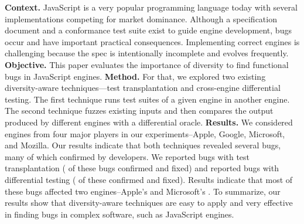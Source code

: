 \textbf{Context.} JavaScript is a very popular programming language today with several
implementations competing for market dominance. Although a
specification document and a conformance test suite exist to guide
engine development, bugs occur and have important practical
consequences. Implementing correct
engines is challenging because the spec is intentionally
incomplete and evolves frequently.
\textbf{Objective.} This paper evaluates the importance of
diversity to find functional bugs in JavaScript engines. \textbf{Method.} For that, we
explored two existing diversity-aware techniques---test transplantation and
cross-engine differential testing. The first technique runs test
suites of a given engine in another engine. The second technique
fuzzes existing inputs and then compares the output produced by
different engines with a differential oracle.
\textbf{Results.} We considered engines from four major players in our
experiments--Apple, Google, Microsoft, and Mozilla. Our results
indicate that both techniques revealed several bugs, many of which
confirmed by developers. We reported \noBugsTransplantation{} bugs
with test transplantation (\noBugsTransplantationConfirmed{} of these bugs
confirmed and \noBugsTransplantationFixed{} fixed) and reported
\noBugsDifferentialTesting{} bugs with differential testing
(\noBugsDifferentialTestingConfirmed{} of these confirmed
and \noBugsDifferentialTestingFixed{} fixed). Results indicate that
most of these bugs affected two engines--Apple's
\jsc{} and Microsoft's \chakra{}. To summarize, our results show that
diversity-aware techniques are easy to apply and very effective in
finding bugs in complex software, such as JavaScript engines.
